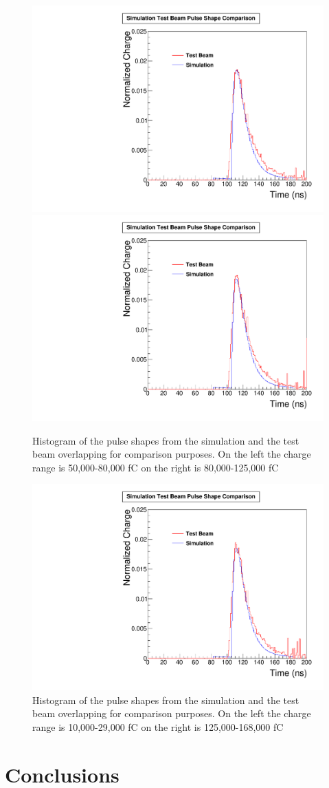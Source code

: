 \begin{figure}
\centering
\includegraphics[width=0.495\linewidth]{Figures/50Comparison.pdf}
\includegraphics[width=0.495\linewidth]{Figures/80Comparison.pdf}
\caption{Histogram of the pulse shapes from the simulation and the test beam overlapping for comparison purposes. On the left the charge range is 50,000-80,000 fC on the right is 80,000-125,000 fC}
\label{fig:2comparison_together}
\end{figure}

\begin{figure}
\centering
\includegraphics[width=0.495\linewidth]{Figures/125Comparison.pdf}
\caption{Histogram of the pulse shapes from the simulation and the test beam overlapping for comparison purposes. On the left the charge range is 10,000-29,000 fC on the right is 125,000-168,000 fC}
\label{fig:3comparison_together}
\end{figure}

\section{Conclusions}

